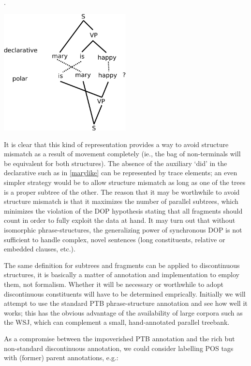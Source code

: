 \documentclass[a4paper]{article}
\theoremstyle{definition}
\begin{document}
\ex. \label{marydiscont}

\begin{center}
\includegraphics[width=0.5\textwidth]{maryishappy-crop.pdf}
\end{center}
\vspace{1em}

It is clear that this kind of representation provides a way to avoid structure
mismatch as a result of movement completely (ie., the bag of non-terminals will
be equivalent for both structures). The absence of the auxiliary `did' in the
declarative such as in \ref{marylike} can be represented by trace elements; an
even simpler strategy would be to allow structure mismatch as long as one of
the trees is a proper subtree of the other. The reason that it may be
worthwhile to avoid structure mismatch is that it maximizes the number of
parallel subtrees, which minimizes the violation of the DOP hypothesis stating
that all fragments should count in order to fully exploit the data at hand. It
may turn out that without isomorphic phrase-structures, the generalizing power
of synchronous DOP is not sufficient to handle complex, novel sentences (long
constituents, relative or embedded clauses, etc.).

The same definition for subtrees and fragments can be applied to discontinuous
structures, it is basically a matter of annotation and implementation to employ
them, not formalism.  Whether it will be necessary or worthwhile to adopt
discontinuous constituents will have to be determined emprically. Initially we
will attempt to use the standard PTB phrase-structure annotation and see how well
it works; this has the obvious advantage of the availability of large corpora such
as the WSJ, which can complement a small, hand-annotated parallel treebank.

\newpage %

As a compromise between the impoverished PTB annotation and the rich but non-standard
discontinuous annotation, we could consider labelling POS tags with (former) parent
annotations, e.g.:
\end{document}
